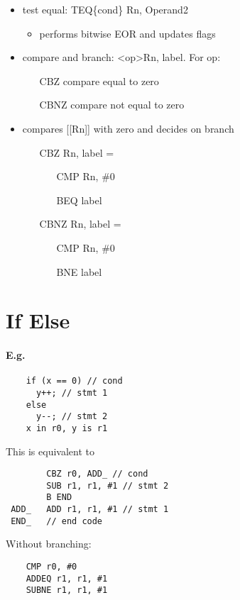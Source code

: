 \documentclass[12pt]{report}
\begin{document}
\begin{itemize}
    \item test equal: TEQ\{cond\} Rn, Operand2
    \begin{itemize}
      \item performs bitwise EOR and updates flags
    \end{itemize}
    \item compare and branch: \textless op\textgreater Rn, label. For op:
    \begin{itemize}
      \item[CBZ] compare equal to zero
      \item[CBNZ] compare not equal to zero
    \end{itemize}
    \item compares [[Rn]] with zero and decides on branch
    \begin{itemize}
      \item[CBZ] Rn, label =
      \begin{itemize}
        \item[CMP] Rn, \#0
        \item[BEQ] label
      \end{itemize}
      \item[CBNZ] Rn, label =
      \begin{itemize}
        \item[CMP] Rn, \#0
        \item[BNE] label
      \end{itemize}
    \end{itemize}
  \end{itemize}

\section{If Else}
  \paragraph{E.g.}
  \begin{lstlisting}
    if (x == 0) // cond
      y++; // stmt 1
    else
      y--; // stmt 2
    x in r0, y is r1
  \end{lstlisting}
  This is equivalent to
  \begin{lstlisting}
        CBZ r0, ADD_ // cond
        SUB r1, r1, #1 // stmt 2
        B END
 ADD_   ADD r1, r1, #1 // stmt 1
 END_   // end code
  \end{lstlisting}
  Without branching:
  \begin{lstlisting}
    CMP r0, #0
    ADDEQ r1, r1, #1
    SUBNE r1, r1, #1
  \end{lstlisting}
\end{document}
